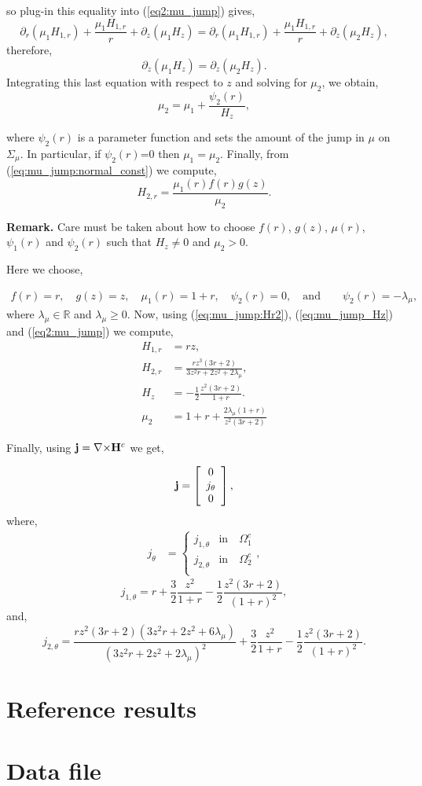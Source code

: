 \documentclass{book}
\def\data_dir{../MHD_DATA_TEST_CONV_PETSC}
\begin{document}
so  plug-in this  equality into (\ref{eq2:mu_jump}) gives,
$$
 \partial _r (\mu_1 H_{1,r}) + \frac{\mu _1  H_{1,r}}{r} +  \partial _z (\mu_1 H_z)  =
 \partial _r (\mu_1 H_{1,r}) + \frac{\mu _1  H_{1,r}}{r} + \partial _z (\mu_2 H_z) ,
$$
therefore,
$$
  \partial _z (\mu_1 H_z ) =  \partial _z (\mu_2 H_z). 
$$
Integrating this last equation with respect to $z$ and solving for $\mu_2$, we obtain,
\begin{equation}
\label{eq:mu_jump_mu2}
\mu_2 = \mu_1 + \frac{\psi_2(r)}{H_z},
\end{equation}

where $\psi_2(r)$ is a  parameter function and sets the amount of the jump in $\mu$ on $\Sigma_{\mu}$. In particular, if $\psi_2(r)$=0 then ${\mu}_1={\mu}_2$. Finally, from (\ref{eq:mu_jump:normal_const}) we compute,
\begin{equation}
\label{eq:mu_jump:Hr2}
  H_{2,r}= \frac{\mu_1(r)f(r)g(z)}{\mu _2}.
\end{equation}

\textbf{Remark.} Care must be taken about how to choose $f(r)$, $g(z)$, $\mu(r)$, $\psi_1(r)$ and $\psi_2(r)$ such that $H_z \neq 0$ and $\mu_2 > 0$.


Here we choose,

\begin{align*}
 f(r)= r, \quad g(z)=z  , \quad \mu_1(r)= 1+r, \quad \psi_2(r)=0, \quad \text{and} \quad \quad \psi_2(r)=-\lambda_{\mu},
\end{align*}
where $\lambda_{\mu} \in\mathbb{R}$ and $\lambda_{\mu} \geq 0$. Now, using (\ref{eq:mu_jump:Hr2}), (\ref{eq:mu_jump_Hz}) and (\ref{eq2:mu_jump}) we compute,
\begin{align*}
 H_{1,r}&=rz, \\
 H_{2,r}&=\frac{rz^3(3 r + 2)}{3z^2r+2z^2+2\lambda_{\mu}},\\
 H_z &= -\frac{1}{2}\frac{z^2(3r+2)}{1+r}.\\
\mu_2 &=  1 +r + \frac{2\lambda_{\mu}(1+r)}{z^2(3r + 2)}
\end{align*}

Finally, using ${\bf j} = \nabla{\times} {\bf H}^c$ we get,

\begin{equation}
{\bf j}=
\left[ \begin{array}{c}
0 \\
j_{\theta}\\
 0
\end{array} \right],
\end{equation}
where,
\begin{align*}
j_{\theta} &=
\begin{cases}
j_{1,\theta}
& \text{in}
\quad \Omega_1^c \\
j_{2,\theta}
& \text{in} \quad \Omega_2^c\\
\end{cases},
\end{align*}
$$
j_{1,\theta}= r+\frac{3}{2}\frac{z^2}{1+r}- \frac{1}{2}\frac{z^2(3r+2)}{(1+r)^2},
$$
 and,
$$
j_{2,\theta}= \frac{rz^2(3r+2)(3z^2r+2z^2+6\lambda_{\mu})}{(3z^2r+2z^2+2\lambda_{\mu})^2}
+\frac{3}{2}\frac{z^2}{1+r}- \frac{1}{2}\frac{z^2(3r+2)}{(1+r)^2}
.
$$

\section{Reference results}
\section{Data file}

\end{document}
